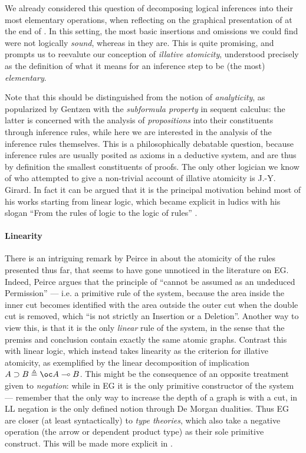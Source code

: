We already considered this question of decomposing logical inferences into their
most elementary operations, when reflecting on the graphical presentation of
 at the end of . In this setting, the
most basic insertions and omissions we could find were not logically
\emph{sound}, whereas in  they are. This is quite promising, and
prompts us to reevalute our conception of \emph{illative atomicity}, understood
precisely as the definition of what it means for an inference step to be (the
most) \emph{elementary}.

Note that this should be distinguished from the notion of \emph{analyticity}, as
popularized by Gentzen with the \emph{subformula property} in sequent calculus:
the latter is concerned with the analysis of \emph{propositions} into their
constituents through inference rules, while here we are interested in the
analysis of the inference rules themselves. This is a philosophically debatable question,
because inference rules are usually posited as axioms in a deductive system, and
are thus by definition the smallest constituents of proofs. The only other
logician we know of who attempted to give a non-trivial account of illative
atomicity is J.-Y. Girard. In fact it can be argued that it is the principal
motivation behind most of his works starting from linear logic, which became
explicit in ludics with his slogan ``From the rules of logic to the logic of
rules'' \cite{girard_locus_2001}.

\paragraph{Linearity}

There is an intriguing remark by Peirce in
\cite[pp.~536--537]{peirce_prolegomena_1906} about the atomicity of the rules
presented thus far, that seems to have gone unnoticed in the literature on EG.
Indeed, Peirce argues that the principle of  ``cannot be
assumed as an undeduced Permission'' --- i.e. a primitive rule of the system,
because the area inside the inner cut becomes identified with the area outside
the outer cut when the double cut is removed, which ``is not strictly an
Insertion or a Deletion''. Another way to view this, is that it is the only
\emph{linear} rule of the system, in the sense that the premiss and conclusion
contain exactly the same atomic graphs. Contrast this with linear logic, which
instead takes linearity as the criterion for illative atomicity, as exemplified
by the linear decomposition of implication $A \limp B \defeq \oc A \multimap B$.
This might be the consequence of an opposite treatment given to \emph{negation}:
while in EG it is the only primitive constructor of the system --- remember that
the only way to increase the depth of a graph is with a cut, in LL negation is
the only defined notion through De Morgan dualities. Thus EG are closer (at
least syntactically) to \emph{type theories}, which also take a negative
operation (the arrow or dependent product type) as their sole primitive
construct. This will be made more explicit in .

